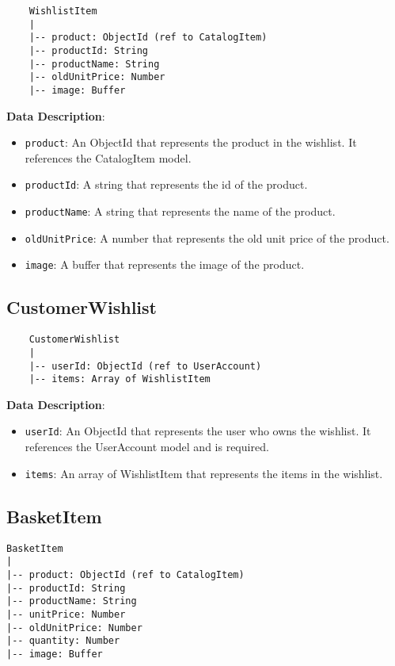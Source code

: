 \begin{verbatim}
    WishlistItem
    |
    |-- product: ObjectId (ref to CatalogItem)
    |-- productId: String
    |-- productName: String
    |-- oldUnitPrice: Number
    |-- image: Buffer
    \end{verbatim}

\textbf{Data Description}:

\begin{itemize}
    \item \texttt{product}: An ObjectId that represents the product in the wishlist. It references the CatalogItem model.
    \item \texttt{productId}: A string that represents the id of the product.
    \item \texttt{productName}: A string that represents the name of the product.
    \item \texttt{oldUnitPrice}: A number that represents the old unit price of the product.
    \item \texttt{image}: A buffer that represents the image of the product.
\end{itemize}

\subsection{CustomerWishlist}

\begin{verbatim}
    CustomerWishlist
    |
    |-- userId: ObjectId (ref to UserAccount)
    |-- items: Array of WishlistItem
    \end{verbatim}

\textbf{Data Description}:

\begin{itemize}
    \item \texttt{userId}: An ObjectId that represents the user who owns the wishlist. It references the UserAccount model and is required.
    \item \texttt{items}: An array of WishlistItem that represents the items in the wishlist.
\end{itemize}


\subsection{BasketItem}

\begin{verbatim}
BasketItem
|
|-- product: ObjectId (ref to CatalogItem)
|-- productId: String
|-- productName: String
|-- unitPrice: Number
|-- oldUnitPrice: Number
|-- quantity: Number
|-- image: Buffer
\end{verbatim}


